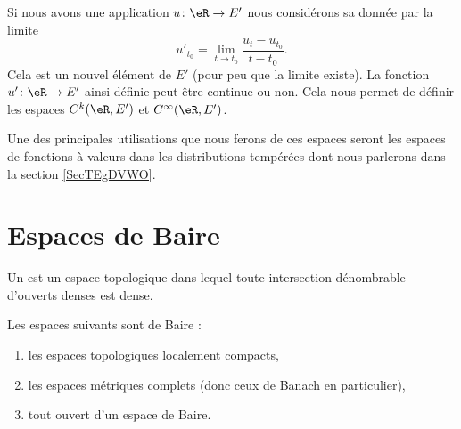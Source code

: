\begin{definition}  \label{DefDZsypWu}
    Si nous avons une application \( u\colon \eR\to E'\) nous considérons sa  donnée par la limite
    \begin{equation}
        u'_{t_0}=\lim_{t\to t_0} \frac{ u_t-u_{t_0} }{ t-t_0 }.
    \end{equation}
    Cela est un nouvel élément de \( E'\) (pour peu que la limite existe). La fonction \( u'\colon \eR\to E'\) ainsi définie peut être continue ou non. Cela nous permet de définir les espaces \( C^k(\eR,E')\) et \( C^{\infty}(\eR,E')\).
\end{definition}
Une des principales utilisations que nous ferons de ces espaces seront les espaces de fonctions à valeurs dans les distributions tempérées dont nous parlerons dans la section \ref{SecTEgDVWO}.

\section{Espaces de Baire}
\label{SecBDlaUrz}

\begin{definition}
    Un  est un espace topologique dans lequel toute intersection dénombrable d'ouverts denses est dense.
\end{definition}

\begin{theorem}    \label{ThoBBIljNM}
    Les espaces suivants sont de Baire :
    \begin{enumerate}
        \item
            les espaces topologiques localement compacts,
        \item
            les espaces métriques complets (donc ceux de Banach en particulier),
        \item
            tout ouvert d'un espace de Baire.
    \end{enumerate}
\end{theorem}

